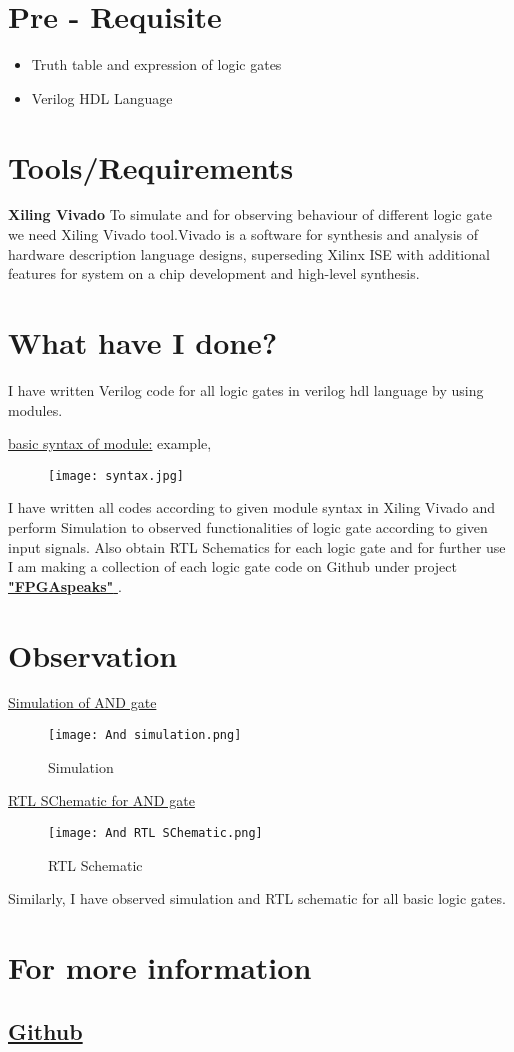 \documentclass{article}
\begin{document}
\section{ Pre - Requisite } 
 \begin{itemize}
 \item Truth table and expression of logic gates
 \item  Verilog HDL Language 
\end{itemize}
\section{ Tools/Requirements }
\textbf{Xiling Vivado}
To simulate and for observing behaviour of different logic gate we need Xiling Vivado tool.Vivado is a software for synthesis and analysis of hardware description language designs, superseding Xilinx ISE with additional features for system on a chip development and high-level synthesis.


\section{ What have I done? }
I have written Verilog code for all logic gates in verilog hdl language by using modules.

\underline{basic syntax of module:} 
\newline 
example,
\begin{figure}[H]
    \centering
    \texttt{[image: syntax.jpg]}
    
    
\end{figure}
I have written all codes according to given module syntax in Xiling Vivado and perform Simulation to observed functionalities of logic gate according to given input signals. Also obtain RTL Schematics for each logic gate and for further use I am making a collection of each logic gate code on Github under project \href{https://github.com/RajKohale/FPGAspeaks}{ \textbf{"FPGAspeaks" }}.

\section{ Observation}
\underline{Simulation of AND gate}
\begin{figure}[H]
    \centering
    \texttt{[image: And simulation.png]}
    \caption{Simulation}
    \label{fig:Simulation}
\end{figure}

\underline{RTL SChematic for AND gate}
\begin{figure}[H]
    \centering
    \texttt{[image: And RTL SChematic.png]}
    \caption{RTL Schematic }
    \label{fig:enter-label}
\end{figure}

Similarly, I have observed simulation and RTL schematic for all basic logic gates.

\section{For more information}
\subsection{
\textbf{
\href{https://github.com/RajKohale/FPGAspeaks}{Github} } }
\end{document}

